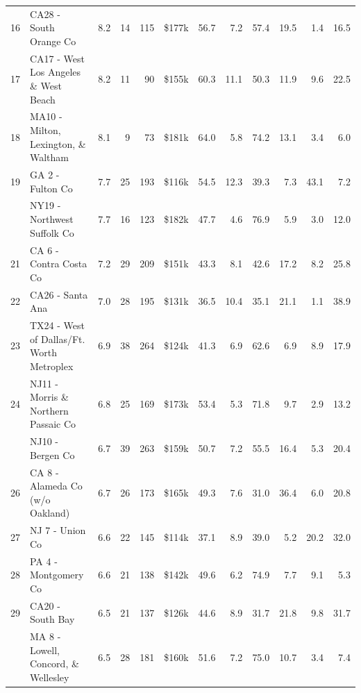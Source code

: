 \begin{table}
\begin{tabular}[t]{llrrrlrrrrrr}
16 & CA28 - South Orange Co & 8.2 & 14 & 115 & \$177k & 56.7 & 7.2 & 57.4 & 19.5 & 1.4 & 16.5\\
17 & CA17 - West Los Angeles \& West Beach & 8.2 & 11 & 90 & \$155k & 60.3 & 11.1 & 50.3 & 11.9 & 9.6 & 22.5\\
18 & MA10 - Milton, Lexington, \& Waltham & 8.1 & 9 & 73 & \$181k & 64.0 & 5.8 & 74.2 & 13.1 & 3.4 & 6.0\\
19 & GA 2 - Fulton Co & 7.7 & 25 & 193 & \$116k & 54.5 & 12.3 & 39.3 & 7.3 & 43.1 & 7.2\\
\addlinespace
20 & NY19 - Northwest Suffolk Co & 7.7 & 16 & 123 & \$182k & 47.7 & 4.6 & 76.9 & 5.9 & 3.0 & 12.0\\
21 & CA 6 - Contra Costa Co & 7.2 & 29 & 209 & \$151k & 43.3 & 8.1 & 42.6 & 17.2 & 8.2 & 25.8\\
22 & CA26 - Santa Ana & 7.0 & 28 & 195 & \$131k & 36.5 & 10.4 & 35.1 & 21.1 & 1.1 & 38.9\\
23 & TX24 - West of Dallas/Ft. Worth Metroplex & 6.9 & 38 & 264 & \$124k & 41.3 & 6.9 & 62.6 & 6.9 & 8.9 & 17.9\\
24 & NJ11 - Morris \& Northern Passaic Co & 6.8 & 25 & 169 & \$173k & 53.4 & 5.3 & 71.8 & 9.7 & 2.9 & 13.2\\
\addlinespace
25 & NJ10 - Bergen Co & 6.7 & 39 & 263 & \$159k & 50.7 & 7.2 & 55.5 & 16.4 & 5.3 & 20.4\\
26 & CA 8 - Alameda Co (w/o Oakland) & 6.7 & 26 & 173 & \$165k & 49.3 & 7.6 & 31.0 & 36.4 & 6.0 & 20.8\\
27 & NJ 7 - Union Co & 6.6 & 22 & 145 & \$114k & 37.1 & 8.9 & 39.0 & 5.2 & 20.2 & 32.0\\
28 & PA 4 - Montgomery Co & 6.6 & 21 & 138 & \$142k & 49.6 & 6.2 & 74.9 & 7.7 & 9.1 & 5.3\\
29 & CA20 - South Bay & 6.5 & 21 & 137 & \$126k & 44.6 & 8.9 & 31.7 & 21.8 & 9.8 & 31.7\\
\addlinespace
30 & MA 8 - Lowell, Concord, \& Wellesley & 6.5 & 28 & 181 & \$160k & 51.6 & 7.2 & 75.0 & 10.7 & 3.4 & 7.4\\
\bottomrule
\end{tabular}
\end{table}
